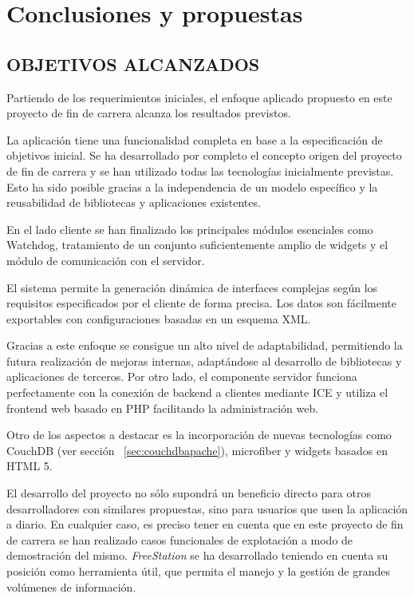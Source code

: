 \cleardoublepage
\chapter{Conclusiones y propuestas}
\thispagestyle{fancy}

\section{\uppercase{Objetivos alcanzados}}

Partiendo de los requerimientos iniciales, el enfoque aplicado propuesto en este
proyecto de fin de carrera alcanza los resultados previstos.

La aplicación tiene una funcionalidad completa en base a la especificación de
objetivos inicial. Se ha desarrollado por completo el concepto origen del
proyecto de fin de carrera y se han utilizado todas las tecnologías inicialmente previstas. Esto ha sido posible gracias a
la independencia de un modelo específico y la
reusabilidad de bibliotecas y aplicaciones existentes.

En el lado cliente se han finalizado los principales módulos esenciales como
Watchdog, tratamiento de un conjunto suficientemente amplio de widgets y el
módulo de comunicación con el servidor.

El sistema permite la generación dinámica de interfaces complejas según los
requisitos especificados por el cliente de forma precisa. Los datos son
fácilmente exportables con configuraciones basadas en un esquema XML.

Gracias a este enfoque se consigue un alto nivel de adaptabilidad, permitiendo
la futura realización de mejoras internas, adaptándose al desarrollo de
bibliotecas y aplicaciones de terceros. Por otro lado, el componente servidor
funciona perfectamente con la conexión de backend a clientes mediante \acs{ICE} y utiliza el frontend web
basado en PHP facilitando la administración web.

\newpage

Otro de los aspectos a destacar es la incorporación de nuevas tecnologías como
CouchDB (ver sección ~\ref{sec:couchdbapache}), microfiber y widgets basados en
HTML 5.

El desarrollo del proyecto no sólo supondrá un beneficio directo para otros
desarrolladores con similares propuestas, sino para usuarios que usen la
aplicación a diario. En cualquier caso, es preciso tener en cuenta que en este
proyecto de fin de carrera se han realizado casos funcionales de explotación a 
modo de demostración del mismo. \emph{FreeStation} se ha desarrollado teniendo
en cuenta su posición como herramienta útil, que permita el manejo y la gestión 
de grandes volúmenes de información.


